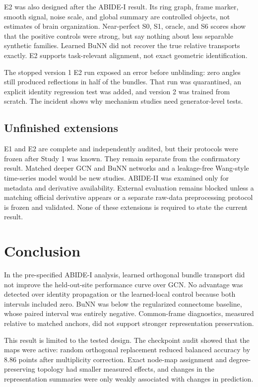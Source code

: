 \documentclass[11pt,a4paper]{article}
\begin{document}
E2 was also designed after the ABIDE-I result. Its ring graph, frame marker,
smooth signal, noise scale, and global summary are controlled objects, not
estimates of brain organization. Near-perfect S0, S1, oracle, and S6 scores
show that the positive controls were strong, but say nothing about less
separable synthetic families. Learned BuNN did not recover the true relative
transports exactly. E2 supports task-relevant alignment, not exact geometric
identification.

The stopped version 1 E2 run exposed an error before unblinding: zero angles
still produced reflections in half of the bundles. That run was quarantined,
an explicit identity regression test was added, and version 2 was trained from
scratch. The incident shows why mechanism studies need generator-level tests.

\subsection{Unfinished extensions}

E1 and E2 are complete and independently audited, but their protocols were
frozen after Study 1 was known. They remain separate from the confirmatory
result. Matched deeper GCN and BuNN networks and a leakage-free Wang-style
time-series model would be new studies. ABIDE-II was examined only for metadata
and derivative availability. External evaluation remains blocked unless a
matching official derivative appears or a separate raw-data preprocessing
protocol is frozen and validated. None of these extensions is required to
state the current result.

\section{Conclusion}

In the pre-specified ABIDE-I analysis, learned orthogonal bundle transport did
not improve the held-out-site performance curve over GCN. No advantage was
detected over identity propagation or the learned-local control because both
intervals included zero. BuNN was below the regularized connectome baseline,
whose paired interval was entirely negative. Common-frame diagnostics,
measured relative to matched anchors, did not support stronger representation
preservation.

This result is limited to the tested design. The checkpoint audit showed that
the maps were active: random orthogonal replacement reduced balanced accuracy
by 8.86 points after multiplicity correction. Exact node-map assignment and
degree-preserving topology had smaller measured effects, and changes in the
representation summaries were only weakly associated with changes in
prediction.
\end{document}
